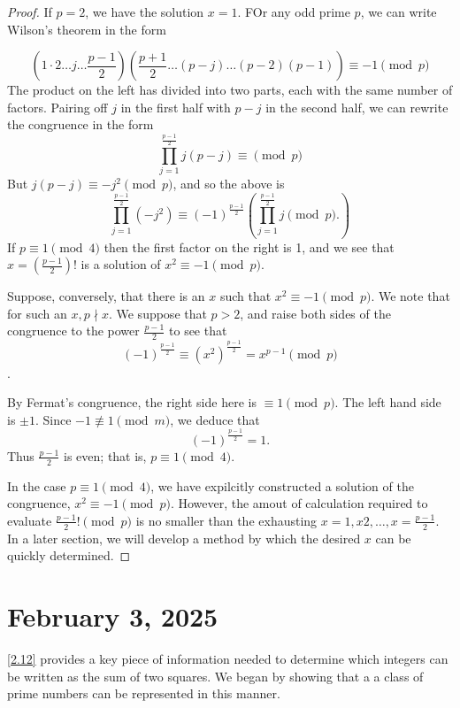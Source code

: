 \documentclass[11pt]{article}
\begin{document}
\begin{proof}
    If \(p = 2\), we have the solution \(x = 1\). FOr any odd prime \(p\), we can write Wilson's theorem in the form

    \[\left(1 \cdot 2 \ldots j \ldots \frac{p - 1}{2}\right)\left(\frac{p + 1}{2} \ldots (p - j) \ldots (p - 2)(p - 1)\right) \equiv -1 \pmod{p}\]
    The product on the left has divided into two parts, each with the same number
    of factors. Pairing off \(j\) in the first half with \(p - j\) in the second
    half, we can rewrite the congruence in the form
    \[\prod_{j = 1}^{\frac{p - 1}{2}} j (p - j)\equiv \pmod{p}\]
    But \(j(p - j) \equiv -j^2 \pmod{p}\), and so the above is
    \[\prod_{j = 1}^{\frac{p - 1}{2}}(-j^2) \equiv (-1)^{\frac{p - 1}{2}}\left(\prod_{j = 1}^{\frac{p - 1}{2}} j \pmod{p}.\right)\]
    If \(p \equiv 1 \pmod{4}\) then the first factor on the right is 1, and we see
    that \(x = \left(\frac{p - 1}{2}\right)!\) is a solution of \(x^2 \equiv -1
    \pmod{p}\).

    Suppose, conversely, that there is an \(x\) such that \(x^2 \equiv -1
    \pmod{p}\). We note that for such an \(x, p \nmid x\). We suppose that \(p >
    2\), and raise both sides of the congruence to the power \(\frac{p - 1}{2}\) to
    see that
    \[(-1)^\frac{p - 1}{2} \equiv (x^2)^{\frac{ p - 1}{2}} = x^{p - 1} \pmod{p}\].

    By Fermat's congruence, the right side here is \(\equiv 1 \pmod{p}\). The left
    hand side is \(\pm 1\). Since \(-1 \not \equiv 1 \pmod{m}\), we deduce that \[(-1)^{\frac{p - 1}{2}} = 1.\] Thus \(\frac{p - 1}{2}\) is even; that is, \(p \equiv 1 \pmod{4}\).

    In the case \(p \equiv 1 \pmod {4}\), we have expilcitly constructed a solution
    of the congruence, \(x^2 \equiv -1 \pmod{p}\). However, the amout of
    calculation required to evaluate \(\frac{p - 1}{2}! \pmod{p}\) is no smaller
    than the exhausting \(x = 1, x 2, \ldots, x = \frac{p - 1}{2}\). In a later
    section, we will develop a method by which the desired \(x\) can be quickly
    determined.
\end{proof}

\section{February 3, 2025}

\cref{2.12} provides a key piece of information needed to determine
which integers can be written as the sum of two squares. We began by showing
that a a class of prime numbers can be represented in this manner.
\end{document}

